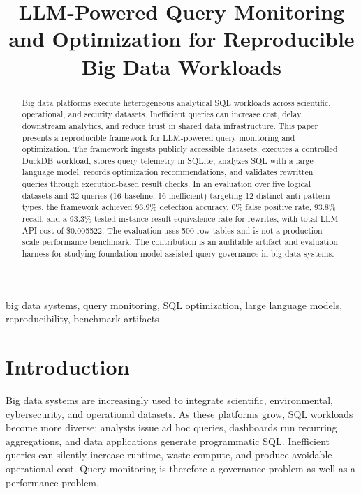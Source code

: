 \documentclass[conference]{IEEEtran}
\begin{document}
\title{LLM-Powered Query Monitoring and Optimization for Reproducible Big Data Workloads}

\author{
}

\maketitle

\begin{abstract}
Big data platforms execute heterogeneous analytical SQL workloads across scientific, operational, and security datasets. Inefficient queries can increase cost, delay downstream analytics, and reduce trust in shared data infrastructure. This paper presents a reproducible framework for LLM-powered query monitoring and optimization. The framework ingests publicly accessible datasets, executes a controlled DuckDB workload, stores query telemetry in SQLite, analyzes SQL with a large language model, records optimization recommendations, and validates rewritten queries through execution-based result checks. In an evaluation over five logical datasets and 32 queries (16 baseline, 16 inefficient) targeting 12 distinct anti-pattern types, the framework achieved 96.9\% detection accuracy, 0\% false positive rate, 93.8\% recall, and a 93.3\% tested-instance result-equivalence rate for rewrites, with total LLM API cost of \$0.005522. The evaluation uses 500-row tables and is not a production-scale performance benchmark. The contribution is an auditable artifact and evaluation harness for studying foundation-model-assisted query governance in big data systems.
\end{abstract}

\begin{IEEEkeywords}
big data systems, query monitoring, SQL optimization, large language models, reproducibility, benchmark artifacts
\end{IEEEkeywords}

\section{Introduction}
Big data systems are increasingly used to integrate scientific, environmental, cybersecurity, and operational datasets. As these platforms grow, SQL workloads become more diverse: analysts issue ad hoc queries, dashboards run recurring aggregations, and data applications generate programmatic SQL. Inefficient queries can silently increase runtime, waste compute, and produce avoidable operational cost. Query monitoring is therefore a governance problem as well as a performance problem.
\end{document}
